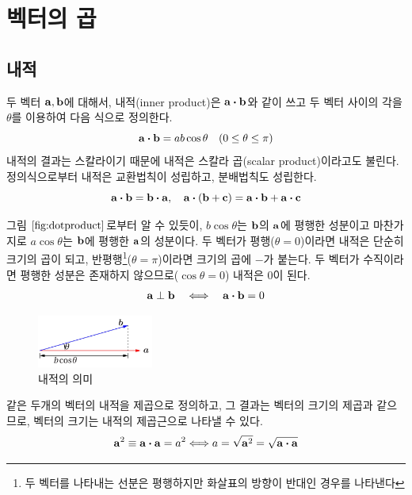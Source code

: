 \section{벡터의 곱}

\subsection{내적}
두 벡터 $\vb{a}, \vb{b}$에 대해서, 내적(inner product)은 $\vb{a} \vdot \vb{b}$와 같이 쓰고 두 벡터 사이의 각을 $\theta$를 이용하여 다음 식으로 정의한다.
\[\vb{a} \vdot \vb{b} = ab \cos{\theta} \quad (0 \leq \theta \leq \pi)
\]
내적의 결과는 스칼라이기 때문에 내적은 스칼라 곱(scalar product)이라고도 불린다. 정의식으로부터 내적은 교환법칙이 성립하고, 분배법칙도 성립한다.
\[\vb{a} \vdot \vb{b} = \vb{b} \vdot \vb{a}, \quad \vb{a} \vdot (\vb{b} + \vb{c}) = \vb{a} \vdot \vb{b} + \vb{a} \vdot \vb{c}
\]

그림 $\ref{fig:dotproduct}$로부터 알 수 있듯이, $b \cos{\theta}$는 $\vb{b}$의 $\vb{a}$에 평행한 성분이고 마찬가지로 $a \cos{\theta}$는 $\vb{b}$에 평행한 $\vb{a}$의 성분이다. 두 벡터가 평행($\theta = 0$)이라면 내적은 단순히 크기의 곱이 되고, 반평행\footnote{두 벡터를 나타내는 선분은 평행하지만 화살표의 방향이 반대인 경우를 나타낸다}($\theta = \pi$)이라면 크기의 곱에 $-$가 붙는다. 두 벡터가 수직이라면 평행한 성분은 존재하지 않으므로($\cos{\theta}=0$) 내적은 0이 된다.
\[
  \vb{a} \perp \vb{b} \quad \Longleftrightarrow \quad \vb{a} \vdot \vb{b} = 0
\]

\begin{figure}
  \centering
  \includegraphics[width=0.34\textwidth]{images/fig1-4}
  \caption{내적의 의미}
  \label{fig:dotproduct}
\end{figure}

같은 두개의 벡터의 내적을 제곱으로 정의하고, 그 결과는 벡터의 크기의 제곱과 같으므로, 벡터의 크기는 내적의 제곱근으로 나타낼 수 있다.
\[
  \vb{a}^2 \equiv \vb{a} \vdot \vb{a} = a^2 \Longleftrightarrow a = \sqrt{\vb{a}^2} = \sqrt{\vb{a} \vdot \vb{a}}
\]

